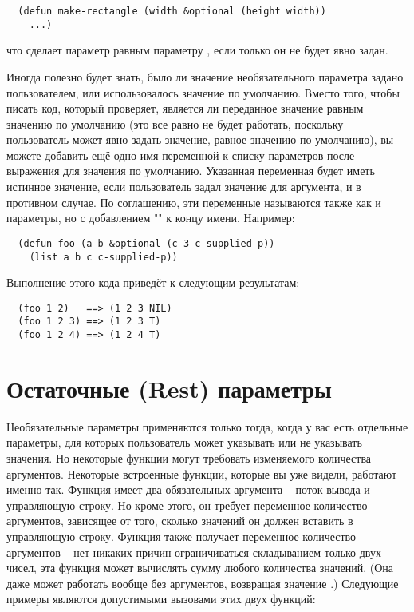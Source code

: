 \begin{lstlisting}
  (defun make-rectangle (width &optional (height width)) 
    ...)
\end{lstlisting}

что сделает параметр  равным параметру , если только он не будет
явно задан.

Иногда полезно будет знать, было ли значение необязательного параметра задано
пользователем, или использовалось значение по умолчанию.  Вместо того, чтобы писать код,
который проверяет, является ли переданное значение равным значению по умолчанию (это все
равно не будет работать, поскольку пользователь может явно задать значение, равное
значению по умолчанию), вы можете добавить ещё одно имя переменной к списку параметров
после выражения для значения по умолчанию.  Указанная переменная будет иметь истинное
значение, если пользователь задал значение для аргумента, и  в противном случае.
По соглашению, эти переменные называются также как и параметры, но с добавлением
"" к концу имени. Например:

\begin{lstlisting}
  (defun foo (a b &optional (c 3 c-supplied-p))
    (list a b c c-supplied-p))
\end{lstlisting}

Выполнение этого кода приведёт к следующим результатам:

\begin{verbatim}
  (foo 1 2)   ==> (1 2 3 NIL)
  (foo 1 2 3) ==> (1 2 3 T)
  (foo 1 2 4) ==> (1 2 4 T)
\end{verbatim}

\section{Остаточные (Rest) параметры}

Необязательные параметры применяются только тогда, когда у вас есть отдельные параметры,
для которых пользователь может указывать или не указывать значения.  Но некоторые функции
могут требовать изменяемого количества аргументов.  Некоторые встроенные функции, которые
вы уже видели, работают именно так.  Функция  имеет два обязательных
аргумента -- поток вывода и управляющую строку.  Но кроме этого, он требует переменное
количество аргументов, зависящее от того, сколько значений он должен вставить в
управляющую строку.  Функция \code{+} также получает переменное количество аргументов --
нет никаких причин ограничиваться складыванием только двух чисел, эта функция может
вычислять сумму любого количества значений. (Она даже может работать вообще без
аргументов, возвращая значение .)  Следующие примеры являются допустимыми вызовами
этих двух функций:

